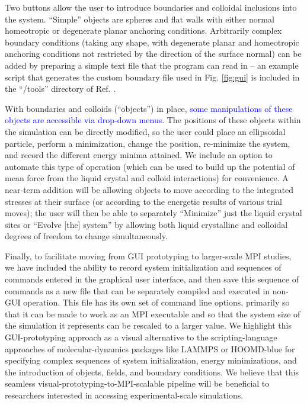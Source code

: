 \documentclass[utf8]{frontiersFPHY} %
\newcommand{\DMS}[1]{\textcolor{blue}{#1}}
\begin{document}
Two buttons allow the user to introduce boundaries and colloidal inclusions into the system. ``Simple'' objects are spheres and flat walls with either normal homeotropic or degenerate planar anchoring conditions. Arbitrarily complex boundary conditions (taking any shape, with degenerate planar and homeotropic anchoring conditions not restricted by the direction of the surface normal) can be added by preparing a simple text file that the program can read in -- an example script that generates the custom boundary file used in Fig. \ref{fig:gui} is included in the ``/tools'' directory of Ref. \cite{landauDeGUI}.

With boundaries and colloids (``objects'') in place, \DMS{some manipulations of these objects are accessible via drop-down menus.} The positions of these objects within the simulation can be directly modified, so the user could place an ellipsoidal particle, perform a minimization, change the position, re-minimize the system, and record the different energy minima attained. We include an option to automate this type of operation (which can be used to build up the potential of mean force from the liquid crystal and colloid interactions) for convenience. A near-term addition will be  allowing objects to move according to the integrated stresses at their surface (or according to the energetic results of various trial moves); the user will then be able to separately ``Minimize'' just the liquid crystal sites or ``Evolve [the] system'' by allowing both liquid crystalline and colloidal degrees of freedom to change simultaneously.

Finally, to facilitate moving from GUI prototyping to larger-scale MPI studies, we have included the ability to record system initialization and sequences of commands entered in the graphical user interface, and then save this sequence of commands as a new file that can be separately compiled and executed in non-GUI operation. This file has its own set of command line options, primarily so that it can be made to work as an MPI executable and so that the system size of the simulation it represents can be rescaled to a larger value. We highlight this GUI-prototyping approach as a visual alternative to the scripting-language approaches of molecular-dynamics packages like LAMMPS \citep{plimpton1995fast} or HOOMD-blue \citep{anderson2008general} for specifying complex sequences of system initialization, energy minimizations, and the introduction of objects, fields, and boundary conditions. We believe that this seamless visual-prototyping-to-MPI-scalable pipeline will be beneficial to researchers interested in accessing experimental-scale simulations.
\end{document}
